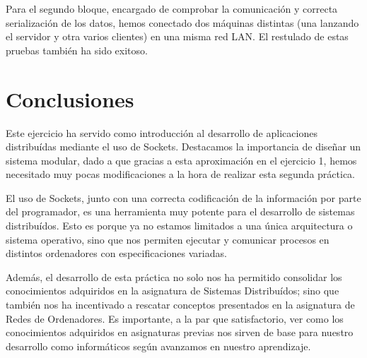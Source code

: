 \documentclass[]{article}
\begin{document}
Para el segundo bloque, encargado de comprobar la comunicación y correcta serialización de los datos, hemos conectado dos máquinas distintas (una lanzando el servidor y otra varios clientes) en una misma red LAN. El restulado de estas pruebas también ha sido exitoso.

\section{Conclusiones}
\label{sec:conclusiones}
Este ejercicio ha servido como introducción al desarrollo de aplicaciones distribuídas mediante el uso de Sockets. Destacamos la importancia de diseñar un sistema modular, dado a que gracias a esta aproximación en el ejercicio 1, hemos necesitado muy pocas modificaciones a la hora de realizar esta segunda práctica. 

El uso de Sockets, junto con una correcta codificación de la información por parte del programador, es una herramienta muy potente para el desarrollo de sistemas distribuídos. Esto es porque ya no estamos limitados a una única arquitectura o sistema operativo, sino que nos permiten ejecutar y comunicar procesos en distintos ordenadores con especificaciones variadas. 

Además, el desarrollo de esta práctica no solo nos ha permitido consolidar los conocimientos adquiridos en la asignatura de Sistemas Distribuídos; sino que también nos ha incentivado a rescatar conceptos presentados en la asignatura de Redes de Ordenadores. Es importante, a la par que satisfactorio, ver como los conocimientos adquiridos en asignaturas previas nos sirven de base para nuestro desarrollo como informáticos según avanzamos en nuestro aprendizaje. 
\end{document}

